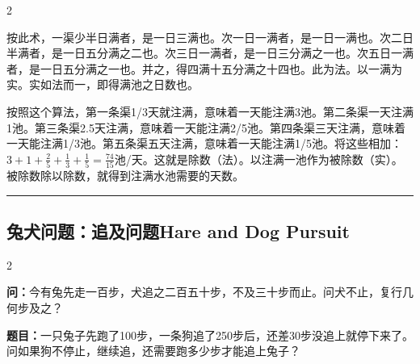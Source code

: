 \documentclass[11pt,a4paper]{article}
\newcommand{\longline}{\noindent\rule{\textwidth}{0.4pt}}
\newcommand{\bilingualsubsection}[2]{%
  \subsection{#1\hfill\normalfont\normalsize\color{sectioncolor}#2}%
}
\begin{document}
\vspace{0.2cm}

\begin{paracol}{2}

\begin{commentarybox}
按此术，一渠少半日满者，是一日三满也。次一日一满者，是一日一满也。次二日半满者，是一日五分满之二也。次三日一满者，是一日三分满之一也。次五日一满者，是一日五分满之一也。并之，得四满十五分满之十四也。此为法。以一满为实。实如法而一，即得满池之日数也。
\end{commentarybox}

\switchcolumn

\begin{commentarybox}
按照这个算法，第一条渠1/3天就注满，意味着一天能注满3池。第二条渠一天注满1池。第三条渠2.5天注满，意味着一天能注满2/5池。第四条渠三天注满，意味着一天能注满1/3池。第五条渠五天注满，意味着一天能注满1/5池。将这些相加：$3 + 1 + \frac{2}{5} + \frac{1}{3} + \frac{1}{5} = \frac{74}{15}$池/天。这就是除数（法）。以注满一池作为被除数（实）。被除数除以除数，就得到注满水池需要的天数。
\end{commentarybox}

\end{paracol}

\vspace{0.5cm}
\longline
\vspace{0.3cm}

\bilingualsubsection{兔犬问题：追及问题}{Hare and Dog Pursuit}

\begin{paracol}{2}

\begin{problembox}[\CJKfamily{rm}兔犬 · 原文]
\textbf{问：}今有兔先走一百步，犬追之二百五十步，不及三十步而止。问犬不止，复行几何步及之？
\end{problembox}

\switchcolumn

\begin{problembox}
\textbf{题目：}一只兔子先跑了100步，一条狗追了250步后，还差30步没追上就停下来了。问如果狗不停止，继续追，还需要跑多少步才能追上兔子？
\end{problembox}

\end{paracol}
\end{document}
